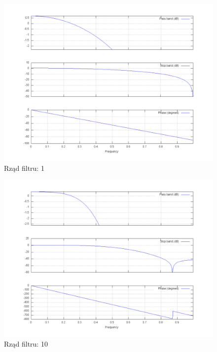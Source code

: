 \documentclass[wide,a4paper,titlepage,12pt]{mwart}
\begin{document}
		
	\begin{landscape}
	  \begin{figure}[htbp]
	    \begin{center}
	      \includegraphics[scale=.5]{out/fig1.png}
	      \caption{\label{fig1} Rząd filtru: 1}
	    \end{center}
	  \end{figure}
	\end{landscape}
	
	\begin{landscape}
	  \begin{figure}[htbp]
	    \begin{center}
	      \includegraphics[scale=.5]{out/fig2.png}
	      \caption{\label{fig2}  Rząd filtru: 10}
	    \end{center}
	  \end{figure}
	\end{landscape}
	
\end{document}
